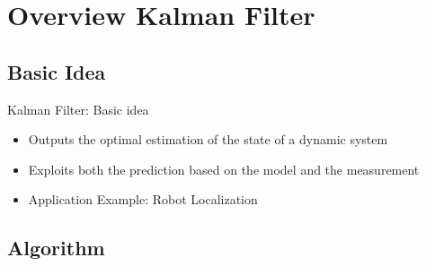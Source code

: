 \section{Overview Kalman Filter} 
\begin{frame}
    \tableofcontents[currentsection]
\end{frame}

\subsection{Basic Idea}
\begin{frame}{Kalman Filter: Basic idea}
\begin{itemize}
    \item Outputs the optimal estimation of the state of a dynamic system
    \item Exploits both the prediction based on the model and the measurement
    \item Application Example: Robot Localization
\end{itemize}
\end{frame}

\subsection{Algorithm}

